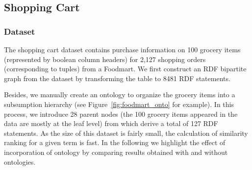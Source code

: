 \subsection{Shopping Cart}
\subsubsection{Dataset}
The shopping cart dataset contains purchase information on 100 grocery items (represented by boolean column headers) for 2,127 shopping orders (corresponding to tuples) from a Foodmart. We first construct an RDF bipartite graph from the dataset by transforming the table to 8481 RDF statements.

Besides, we manually create an ontology to organize the grocery items into a subsumption hierarchy (see Figure~\ref{fig:foodmart_onto} for example). In this process, we introduce 28 parent nodes (the 100 grocery items appeared in the data are mostly at the leaf level) from which derive a total of 127 RDF statements. As the size of this dataset is fairly small, the calculation of similarity ranking for a given term is fast. In the following we highlight the effect of incorporation of ontology by comparing results obtained with and without ontologies.


